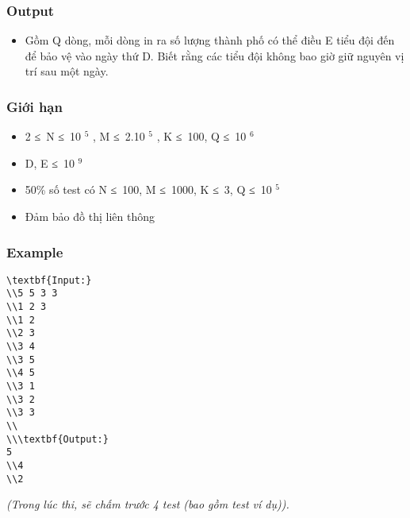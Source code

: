\subsubsection{   Output  }
\begin{itemize}
	\item     Gồm Q dòng, mỗi dòng in ra số lượng thành phố có thể điều E tiểu đội đến để bảo vệ vào ngày thứ D. Biết rằng các tiểu đội không bao giờ giữ nguyên vị trí sau một ngày.   
\end{itemize}

\subsubsection{   Giới hạn  }
\begin{itemize}
	\item     2 ≤ N ≤ 10    $^     5    $    , M ≤ 2.10    $^     5    $    , K ≤ 100, Q ≤ 10    $^     6    $
	\item     D, E ≤ 10    $^     9    $
	\item     50\% số test có N ≤ 100, M ≤ 1000, K ≤ 3, Q ≤ 10    $^     5    $
	\item     Đảm bảo đồ thị liên thông   
\end{itemize}

\subsubsection{   Example  }
\begin{verbatim}
\textbf{Input:}
\\5 5 3 3
\\1 2 3
\\1 2
\\2 3
\\3 4
\\3 5
\\4 5
\\3 1
\\3 2
\\3 3
\\
\\\textbf{Output:}
5
\\4
\\2\end{verbatim}

\emph{    (Trong lúc thi, sẽ chấm trước 4 test (bao gồm test ví dụ)).   }
